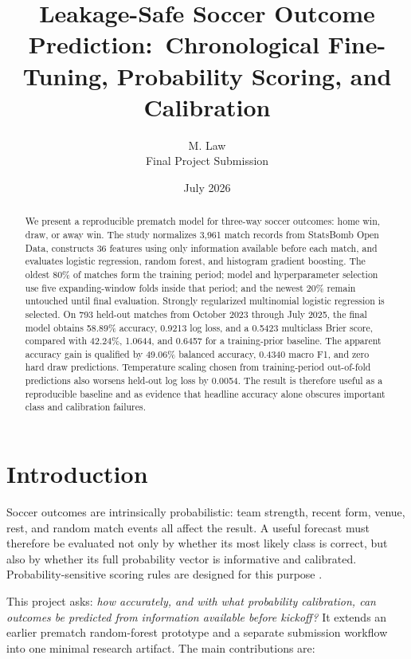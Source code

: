 \documentclass[10pt]{article}
\title{Leakage-Safe Soccer Outcome Prediction:\
Chronological Fine-Tuning, Probability Scoring, and Calibration}
\author{M. Law\\Final Project Submission}
\date{July 2026}
\begin{document}
\maketitle

\begin{abstract}
We present a reproducible prematch model for three-way soccer outcomes: home win,
draw, or away win. The study normalizes 3,961 match records from StatsBomb Open
Data, constructs 36 features using only information available before each match,
and evaluates logistic regression, random forest, and histogram gradient boosting.
The oldest 80\% of matches form the training period; model and hyperparameter
selection use five expanding-window folds inside that period; and the newest 20\%
remain untouched until final evaluation. Strongly regularized multinomial logistic
regression is selected. On 793 held-out matches from October 2023 through July 2025,
the final model obtains 58.89\% accuracy, 0.9213 log loss, and a 0.5423 multiclass
Brier score, compared with 42.24\%, 1.0644, and 0.6457 for a training-prior
baseline. The apparent accuracy gain is qualified by 49.06\% balanced accuracy,
0.4340 macro F1, and zero hard draw predictions. Temperature scaling chosen from
training-period out-of-fold predictions also worsens held-out log loss by 0.0054.
The result is therefore useful as a reproducible baseline and as evidence that
headline accuracy alone obscures important class and calibration failures.
\end{abstract}

\section{Introduction}

Soccer outcomes are intrinsically probabilistic: team strength, recent form,
venue, rest, and random match events all affect the result. A useful forecast must
therefore be evaluated not only by whether its most likely class is correct, but
also by whether its full probability vector is informative and calibrated.
Probability-sensitive scoring rules are designed for this purpose
\cite{brier1950,gneiting2007}.

This project asks: \emph{how accurately, and with what probability calibration,
can outcomes be predicted from information available before kickoff?} It extends
an earlier prematch random-forest prototype and a separate submission workflow
into one minimal research artifact. The main contributions are:
\end{document}
